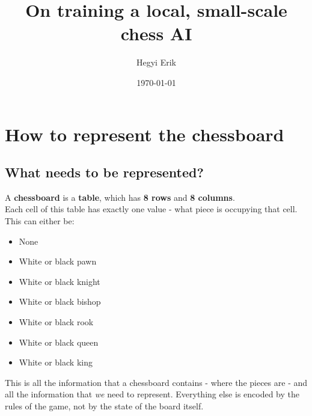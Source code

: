 \documentclass[12pt]{article}
\begin{document}
	

\title{On training a local, small-scale chess AI}
\author{Hegyi Erik}
\date{\today}
\maketitle

\newpage

\tableofcontents

\newpage

\setcounter{page}{1}

\section{How to represent the chessboard}

\subsection{What needs to be represented?}\label{What needs to be represented?}
A \textbf{chessboard} is a \textbf{table}, which has \textbf{8 rows} and \textbf{8 columns}. \\
Each cell of this table has exactly one value - what piece is occupying that cell. This can either be:
\begin{itemize}
	\setlength{\itemsep}{0.5em}
	
	\item None
	\item White or black pawn
	\item White or black knight
	\item White or black bishop
	\item White or black rook
	\item White or black queen
	\item White or black king
\end{itemize}
This is all the information that a chessboard contains - where the pieces are - and all the information that \textit{we} need to represent. Everything else is encoded by the rules of the game, not by the state of the board itself.

\end{document}
